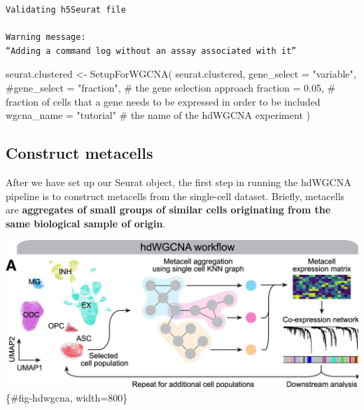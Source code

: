 \documentclass[
  letterpaper,
  DIV=11,
  numbers=noendperiod]{scrartcl}
\newenvironment{Shaded}{\begin{snugshade}}{\end{snugshade}}
\newcommand{\AttributeTok}[1]{\textcolor[rgb]{0.40,0.45,0.13}{#1}}
\newcommand{\CommentTok}[1]{\textcolor[rgb]{0.37,0.37,0.37}{#1}}
\newcommand{\FloatTok}[1]{\textcolor[rgb]{0.68,0.00,0.00}{#1}}
\newcommand{\FunctionTok}[1]{\textcolor[rgb]{0.28,0.35,0.67}{#1}}
\newcommand{\NormalTok}[1]{\textcolor[rgb]{0.00,0.23,0.31}{#1}}
\newcommand{\OtherTok}[1]{\textcolor[rgb]{0.00,0.23,0.31}{#1}}
\newcommand{\StringTok}[1]{\textcolor[rgb]{0.13,0.47,0.30}{#1}}
\begin{document}
\begin{verbatim}
Validating h5Seurat file

Warning message:
“Adding a command log without an assay associated with it”
\end{verbatim}

\begin{Shaded}
\begin{Highlighting}[]
\NormalTok{seurat.clustered }\OtherTok{\textless{}{-}} \FunctionTok{SetupForWGCNA}\NormalTok{(}
\NormalTok{  seurat.clustered,}
  \AttributeTok{gene\_select =} \StringTok{"variable"}\NormalTok{,}
  \CommentTok{\#gene\_select = "fraction", \# the gene selection approach}
  \AttributeTok{fraction =} \FloatTok{0.05}\NormalTok{, }\CommentTok{\# fraction of cells that a gene needs to be expressed in order to be included}
  \AttributeTok{wgcna\_name =} \StringTok{"tutorial"} \CommentTok{\# the name of the hdWGCNA experiment}
\NormalTok{)}
\end{Highlighting}
\end{Shaded}

\subsection{Construct metacells}\label{construct-metacells}

After we have set up our Seurat object, the first step in running the
hdWGCNA pipeline is to construct metacells from the single-cell dataset.
Briefly, metacells are \textbf{aggregates of small groups of similar
cells originating from the same biological sample of origin}.

\includegraphics{./images/hdwgcna.jpg} \{\#fig-hdwgcna, width=800\}
\end{document}
